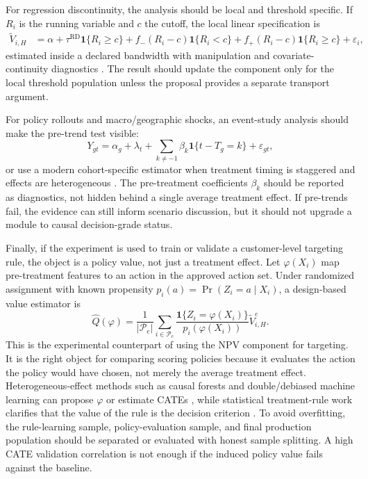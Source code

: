 \documentclass[11pt]{article}
\newcommand{\1}{\mathbf{1}}
\begin{document}
For regression discontinuity, the analysis should be local and threshold
specific. If $R_i$ is the running variable and $c$ the cutoff, the local
linear specification is
\begin{align}
  \widetilde{V}_{i,H}
  &=
  \alpha
  +\tau^{\mathrm{RD}}\1\{R_i\ge c\}
  +f_-(R_i-c)\1\{R_i<c\}
  +f_+(R_i-c)\1\{R_i\ge c\}
  +\varepsilon_i,
  \label{eq:rd-local-spec}
\end{align}
estimated inside a declared bandwidth with manipulation and covariate-continuity
diagnostics \citep{lee2010rd}. The result should update the component only for
the local threshold population unless the proposal provides a separate
transport argument.

For policy rollouts and macro/geographic shocks, an event-study analysis should
make the pre-trend test visible:
\begin{equation}
  Y_{gt}
  =
  \alpha_g+\lambda_t
  +\sum_{k\ne -1}\beta_k\1\{t-T_g=k\}
  +\varepsilon_{gt},
  \label{eq:event-study-spec}
\end{equation}
or use a modern cohort-specific estimator when treatment timing is staggered
and effects are heterogeneous
\citep{callaway2021did,sun2021eventstudy}. The pre-treatment coefficients
$\beta_k$ should be reported as diagnostics, not hidden behind a single
average treatment effect. If pre-trends fail, the evidence can still inform
scenario discussion, but it should not upgrade a module to causal
decision-grade status.

Finally, if the experiment is used to train or validate a customer-level
targeting rule, the object is a policy value, not just a treatment effect.
Let $\varphi(X_i)$ map pre-treatment features to an action in the approved
action set. Under randomized assignment with known propensity
$p_i(a)=\Pr(Z_i=a\mid X_i)$, a design-based value estimator is
\begin{equation}
  \widehat{Q}(\varphi)
  =
  \frac{1}{|\mathcal{P}_e|}
  \sum_{i\in\mathcal{P}_e}
  \frac{\1\{Z_i=\varphi(X_i)\}}
       {p_i(\varphi(X_i))}
  \widetilde{V}^{e}_{i,H}.
  \label{eq:policy-value-estimator}
\end{equation}
This is the experimental counterpart of using the NPV component for targeting.
It is the right object for comparing scoring policies because it evaluates the
action the policy would have chosen, not merely the average treatment effect.
Heterogeneous-effect methods such as causal forests and double/debiased
machine learning can propose $\varphi$ or estimate CATEs
\citep{wager2018causalforests,chernozhukov2018dml}, while statistical
treatment-rule work clarifies that the value of the rule is the decision
criterion \citep{manski2004treatment}. To avoid overfitting, the rule-learning
sample, policy-evaluation sample, and final production population should be
separated or evaluated with honest sample splitting. A high CATE validation
correlation is not enough if the induced policy value fails against the
baseline.
\end{document}
